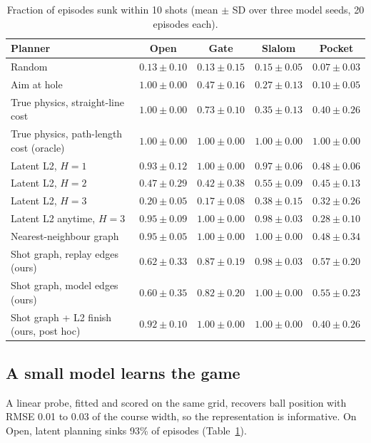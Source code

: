 \documentclass[10pt,twocolumn]{article}
\begin{document}
\begin{table}[t]
\centering\small
\begin{tabular}{@{}lcccc@{}}
\toprule
Planner & Open & Gate & Slalom & Pocket\\
\midrule
Random & $0.13\pm0.10$ & $0.13\pm0.15$ & $0.15\pm0.05$ & $0.07\pm0.03$\\
Aim at hole & $1.00\pm0.00$ & $0.47\pm0.16$ & $0.27\pm0.13$ & $0.10\pm0.05$\\
True physics, straight-line cost & $1.00\pm0.00$ & $0.73\pm0.10$ & $0.35\pm0.13$ & $0.40\pm0.26$\\
True physics, path-length cost (oracle) & $1.00\pm0.00$ & $1.00\pm0.00$ & $1.00\pm0.00$ & $1.00\pm0.00$\\
\midrule
Latent L2, $H{=}1$ & $0.93\pm0.12$ & $1.00\pm0.00$ & $0.97\pm0.06$ & $0.48\pm0.06$\\
Latent L2, $H{=}2$ & $0.47\pm0.29$ & $0.42\pm0.38$ & $0.55\pm0.09$ & $0.45\pm0.13$\\
Latent L2, $H{=}3$ & $0.20\pm0.05$ & $0.17\pm0.08$ & $0.38\pm0.15$ & $0.32\pm0.26$\\
Latent L2 anytime, $H{=}3$ & $0.95\pm0.09$ & $1.00\pm0.00$ & $0.98\pm0.03$ & $0.28\pm0.10$\\
\midrule
Nearest-neighbour graph \cite{you2026ngc} & $0.95\pm0.05$ & $1.00\pm0.00$ & $1.00\pm0.00$ & $0.48\pm0.34$\\
Shot graph, replay edges (ours) & $0.62\pm0.33$ & $0.87\pm0.19$ & $0.98\pm0.03$ & $0.57\pm0.20$\\
Shot graph, model edges (ours) & $0.60\pm0.35$ & $0.82\pm0.20$ & $1.00\pm0.00$ & $0.55\pm0.23$\\
Shot graph + L2 finish (ours, post hoc) & $0.92\pm0.10$ & $1.00\pm0.00$ & $1.00\pm0.00$ & $0.40\pm0.26$\\
\bottomrule
\end{tabular}
\caption{Fraction of episodes sunk within 10 shots (mean $\pm$ SD over three model seeds, 20 episodes each).}
\label{tab:planners}
\end{table}

\subsection{A small model learns the game}
A linear probe, fitted and scored on the same grid, recovers ball position with RMSE 0.01 to 0.03 of the course width, so the representation is informative. On Open, latent planning sinks 93\% of episodes (Table~\ref{tab:planners}).
\end{document}
